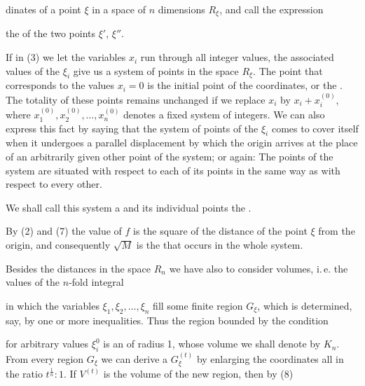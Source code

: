 dinates of a point $\xi$ in a space of $n$ dimensions
$R_\xi$, and call the expression


the  of the two points $\xi'$, $\xi''$.

If in (3) we let the variables $x_i$ run through all integer
values, the associated values of the $\xi_i$ give us a system of
points in the space $R_\xi$. The point that corresponds to the
values $x_i = 0$ is the initial point of the coordinates, or the
. The totality of these points remains unchanged if we
replace $x_i$ by $x_i + x_i^{(0)}$, where $x_1^{(0)}, x_2^{(0)},
\ldots, x_n^{(0)}$ denotes a fixed system of integers. We can also
express this fact by saying that the system of points of the
$\xi_i$ comes to cover itself when it undergoes a parallel
displacement by which the origin arrives at the place of an
arbitrarily given other point of the system; or again: The points
of the system are situated with respect to each of its points in
the same way as with respect to every other.

We shall call this system a  and its
individual points the .

By (2) and (7) the value of $f$ is the square of the distance of
the point $\xi$ from the origin, and consequently $\sqrt{M}$ is
the  that occurs in
the whole system.

Besides the distances in the space $R_n$ we have also to consider
volumes, i.\,e. the values of the $n$-fold integral


in which the variables $\xi_1, \xi_2, \ldots, \xi_n$ fill some
finite region $G_\xi$, which is determined, say, by one or more
inequalities. Thus the region bounded by the condition


for arbitrary values $\xi_i^0$ is an  of
radius 1, whose volume we shall denote by $K_n$. From every
region $G_\xi$ we can derive a  $G_\xi^{(t)}$ by
enlarging the coordinates all in the ratio $t^{\frac{1}{n}} : 1$.
If $V^{(t)}$ is the volume of the new region, then by (8)

